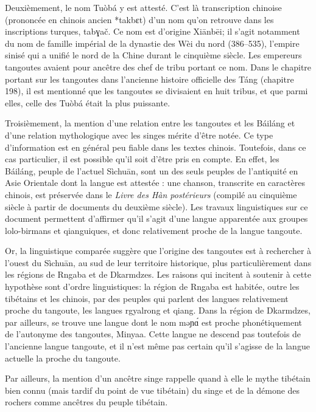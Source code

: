 \documentclass[oldfontcommands,oneside,a4paper,11pt]{memoir}
\newcommand{\ipa}[1]{{\phon #1}} %
\newcommand{\ipapl}[1]{{\phondroit #1}}
\begin{document}
Deuxièmement, le nom Tuòbá y est attesté. C'est là transcription chinoise (prononcée en chinois ancien *takb\ipapl{ɛ}t) d'un nom qu'on retrouve dans les inscriptions turques, \ipa{tabɣač}. Ce nom est d'origine Xiānbēi; il s'agit notamment du nom de famille impérial de la dynastie des Wèi du nord (386–535), l'empire sinisé qui a unifié le nord de la Chine durant le cinquième siècle. Les empereurs tangoutes avaient pour ancêtre des chef de tribu portant ce nom. Dans le chapitre portant sur les tangoutes dans \ipa{l'ancienne histoire officielle des Táng} (chapitre 198), il est mentionné que les tangoutes se divisaient en huit tribus, et que parmi elles, celle des Tuòbá était la plus puissante.

Troisièmement, la mention d'une relation entre les tangoutes et les \ipapl{Báiláng} et d'une relation mythologique avec les singes mérite d'être notée. Ce type d'information est en général peu fiable dans les textes chinois. Toutefois, dans ce cas particulier, il est possible qu'il soit  d'être pris en compte. En effet, les \ipapl{Báiláng}, peuple de l'actuel Sìchuān, sont un des seuls peuples de l'antiquité en Asie Orientale dont la langue est attestée : une chanson, transcrite en caractères chinois, est préservée dans le  \textit{Livre des Hàn postérieurs} (compilé au cinquième siècle à partir de documents du deuxième siècle). Les travaux linguistiques sur ce document permettent d'affirmer qu'il s'agit d'une langue apparentée aux groupes lolo-birmans et qianguiques, et donc relativement proche de la langue tangoute. 

Or, la linguistique comparée suggère que l'origine des tangoutes est à rechercher à l'ouest du Sìchuān, au sud de leur territoire historique, plus particulièrement dans les régions de Rngaba et de Dkarmdzes. Les raisons qui incitent à soutenir à cette hypothèse sont d'ordre linguistiques: la région de Rngaba est habitée, outre les tibétains et les chinois, par des peuples qui parlent des langues relativement proche du tangoute, les langues rgyalrong et qiang. Dans la région de Dkarmdzes, par ailleurs, se trouve une langue dont le nom \ipa{məɲɑ́} est proche phonétiquement de l'autonyme des tangoutes, Minyaa. Cette langue ne descend pas toutefois de l'ancienne langue tangoute, et il n'est même pas certain qu'il s'agisse de la langue actuelle la proche du tangoute. 

Par ailleurs, la mention d'un ancêtre singe rappelle quand à elle le mythe tibétain bien connu (mais tardif du point de vue tibétain) du singe et de la démone des rochers comme ancêtres du peuple tibétain.
\end{document}
